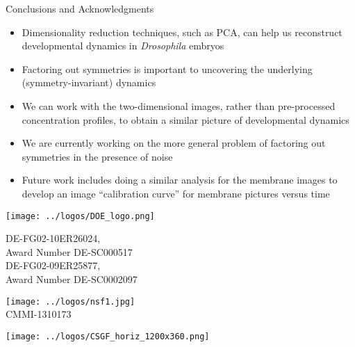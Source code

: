 \documentclass[10pt]{beamer}
\begin{document}
\begin{frame}{Conclusions and Acknowledgments}
    \begin{itemize}
        \item Dimensionality reduction techniques, such as PCA, can help  us reconstruct developmental dynamics in {\em Drosophila} embryos
        \item Factoring out symmetries is important to uncovering the underlying (symmetry-invariant) dynamics
        \item We can work with the two-dimensional images, rather than pre-processed concentration profiles, to obtain a similar picture of developmental dynamics
		\item We are currently working on the more general problem of factoring out symmetries in the presence of noise
        \item Future work includes doing a similar analysis for the membrane images to develop an image ``calibration curve'' for membrane pictures versus time
        
    \end{itemize}
    
     \vfill
    
    \centering
    \begin{minipage}{0.2\textwidth}
    	\centering
    	\texttt{[image: ../logos/DOE\_logo.png]}\\
		{\footnotesize DE-FG02-10ER26024, \\Award Number DE-SC000517 \\ DE-FG02-09ER25877, \\Award Number DE-SC0002097 \par}
    \end{minipage}
    \begin{minipage}{0.2\textwidth}
    	\centering
    	\texttt{[image: ../logos/nsf1.jpg]}\\
		{\footnotesize CMMI-1310173}
    \end{minipage}
    \begin{minipage}{0.2\textwidth}
	    \centering
    	\texttt{[image: ../logos/CSGF\_horiz\_1200x360.png]}
    \end{minipage}
    
\end{frame}
\end{document}
